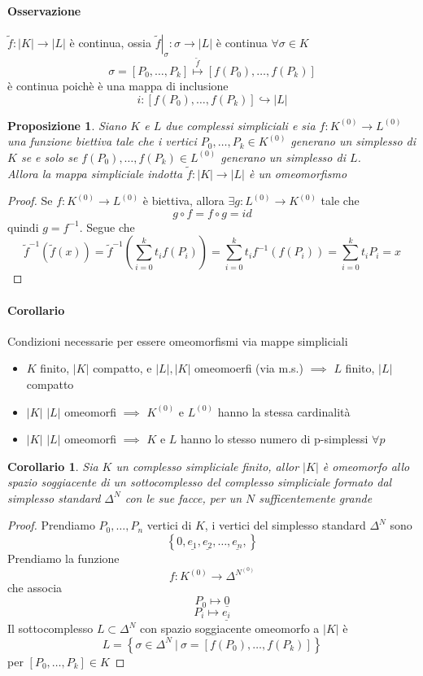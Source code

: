 \documentclass[a4paper]{report}
\newtheorem{proposition}{Proposizione}
\newtheorem{corollary}{Corollario}
\newcommand{\ra}{\ensuremath{\rightarrow}}
\newcommand{\setst}[2]{\ensuremath{\left\{{#1}\ |\ {#2}\right\}}}
\newcommand{\pskel}[2]{\ensuremath{{#1}^{({#2})}}}
\begin{document}
\paragraph{Osservazione} $\tilde{f}:|K|\ra|L|$ è continua, ossia $\left.\tilde{f}\right|_\sigma:\sigma\ra|L|$ è continua $\forall\sigma\in K$
\[
    \sigma=[P_0,\dots,P_k]\overset{\tilde{f}}{\longmapsto}[f(P_0),\dots,f(P_k)]
\]
è continua poichè è una mappa di inclusione
\[
    i:[f(P_0),\dots,f(P_k)]\hookrightarrow|L|
\]
\begin{proposition}
    Siano $K$ e $L$ due complessi simpliciali e sia $f:\pskel{K}{0}\ra\pskel{L}{0}$ una funzione biettiva tale che i vertici $P_0,\dots,P_k\in\pskel{K}{0}$ generano un simplesso di $K$ se e solo se $f(P_0),\dots,f(P_k)\in\pskel{L}{0}$ generano un simplesso di $L$.\\
    Allora la mappa simpliciale indotta $\tilde{f}:|K|\ra|L|$ è un omeomorfismo
\end{proposition}
\begin{proof}
    Se $f:\pskel{K}{0}\ra\pskel{L}{0}$ è biettiva, allora $\exists g:\pskel{L}{0}\ra\pskel{K}{0}$ tale che
    \[
        g\circ f=f\circ g=id
    \]
    quindi $g=f^{-1}$. Segue che
    \[
        \tilde{f}^{-1}\left(\tilde{f}(x)\right)=\tilde{f}^{-1}\left(\sum_{i=0}^kt_if(P_i)\right)=\sum_{i=0}^k t_if^{-1}\left(f(P_i)\right)=\sum_{i=0}^k t_iP_i=x
    \]
\end{proof}
\paragraph{Corollario} Condizioni necessarie per essere omeomorfismi via mappe simpliciali
\begin{itemize}
    \item $K$ finito, $|K|$ compatto, e $|L|,|K|$ omeomoerfi (via m.s.) $\implies$ $L$ finito, $|L|$ compatto
    \item $|K|$ $|L|$ omeomorfi $\implies$ \pskel{K}{0} e \pskel{L}{0} hanno la stessa cardinalità
    \item $|K|$ $|L|$ omeomorfi $\implies$ $K$ e $L$ hanno lo stesso numero di p-simplessi $\forall p$
\end{itemize}
\begin{corollary}
    Sia $K$ un complesso simpliciale finito, allor $|K|$ è omeomorfo allo spazio soggiacente di un sottocomplesso del complesso simpliciale formato dal simplesso standard $\Delta^N$ con le sue facce, per un $N$ sufficentemente grande
\end{corollary}
\begin{proof}
    Prendiamo $P_0,\dots,P_n$ vertici di $K$, i vertici del simplesso standard $\Delta^N$ sono
    \[
        \left\{0,\underline{e_1},\underline{e_2},\dots,\underline{e_n},\right\}
    \]
    Prendiamo la funzione
    \[
        f:\pskel{K}{0}\ra\Delta^{N^{(0)}}
    \]
    che associa
    \[
        P_0\longmapsto\underline{0}
    \]
    \[
        P_i\longmapsto\underline{e_i}
    \]
    Il sottocomplesso $L\subset\Delta^N$ con spazio soggiacente omeomorfo a $|K|$ è
    \[
        L=\setst{\sigma\in\Delta^N}{\sigma=[f(P_0),\dots,f(P_k)]}
    \]
    per $[P_0,\dots,P_k]\in K$
\end{proof}
\end{document}
